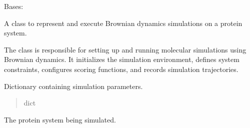 \documentclass[letterpaper,10pt,english]{sphinxmanual}
\begin{document}

\begin{fulllineitems}
\label{\detokenize{src:src.Simulation_Class.Simulation}}
\pysigstartsignatures
{}
\pysigstopsignatures
\sphinxAtStartPar
Bases: 

\sphinxAtStartPar
A class to represent and execute Brownian dynamics simulations on a protein system.

\sphinxAtStartPar
The  class is responsible for setting up and running molecular simulations
using Brownian dynamics. It initializes the simulation environment, defines system constraints,
configures scoring functions, and records simulation trajectories.

\begin{fulllineitems}
\label{\detokenize{src:src.Simulation_Class.Simulation.param}}
\pysigstartsignatures
{}
\pysigstopsignatures
\sphinxAtStartPar
Dictionary containing simulation parameters.
\begin{quote}\begin{description}
\sphinxAtStartPar
dict

\end{description}\end{quote}

\end{fulllineitems}


\begin{fulllineitems}
\label{\detokenize{src:src.Simulation_Class.Simulation.system}}
\pysigstartsignatures
{}
\pysigstopsignatures
\sphinxAtStartPar
The protein system being simulated.
\begin{quote}\begin{description}
\sphinxAtStartPar
{\hyperref[\detokenize{src:src.System_Class.System}]{}}


\end{description}
\end{quote}
\end{fulllineitems}
\end{fulllineitems}
\end{document}
